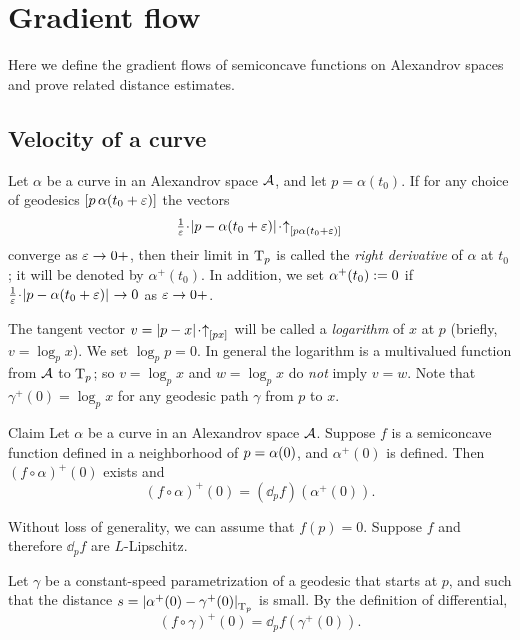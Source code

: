 \chapter{Gradient flow}\label{chap:GF}

Here we define the gradient flows of semiconcave functions on Alexandrov spaces and prove related distance estimates.

\section{Velocity of a curve}\label{Velocity of curve}

Let $\alpha$ be a curve in an Alexandrov space $\mathcal{A}$, and let $p=\alpha(t_0)$.
If for any choice of 
geodesics $[p\,\alpha(t_0+\varepsilon)]$ the vectors 
\[\tfrac{1}{\eps}\cdot\dist{p}{\alpha(t_0+\eps)}{}\cdot\dir p{\alpha(t_0+\eps)}\]
converge as $\varepsilon\to 0+$, then their limit in $\mathrm{T}_p$ is called the \emph{right derivative} of $\alpha$ at $t_0$; it will be denoted by $\alpha^+(t_0)$.
In addition, we set $\alpha^+(t_0)\mathrel{:=}0$
if $\tfrac{1}{\eps}\cdot\dist{p}{\alpha(t_0+\eps)}{}\to 0$ as $\varepsilon\to 0+$.

The tangent vector $v=\dist px{}\cdot\dir px$ will be called a \emph{logarithm} of $x$ at $p$ (briefly, $v=\log_p x$).
We set $\log_p p=0$.
In general the logarithm is a multivalued function from $\mathcal{A}$ to $\mathrm{T}_p$; so $v=\log_p x$ and $w=\log_p x$ do \textit{not} imply $v=w$.
Note that $\gamma^+(0)=\log_px$ for any geodesic path $\gamma$ from $p$ to $x$.\label{page:log}

\begin{thm}{Claim}\label{clm:fa'=dfa'}
Let $\alpha$ be a curve in an Alexandrov space $\mathcal{A}$.
Suppose $f$ is a semiconcave function defined in a neighborhood of $p\z=\alpha(0)$, and $\alpha^+(0)$ is defined.
Then $(f\circ\alpha)^+(0)$ exists and 
\[(f\circ\alpha)^+(0)
=
(\dd_pf)(\alpha^+(0)).\]

\end{thm}

Without loss of generality, we can assume that $f(p)=0$.
Suppose $f$ and therefore $\dd_pf$ are $L$-Lipschitz.

Let $\gamma$ be a constant-speed parametrization of a geodesic that starts at $p$, and
such that the distance
$s=\dist{\alpha^+(0)}{\gamma^+(0)}{\T_p}$
is small.
By the definition of differential,
\[(f\circ\gamma)^+(0)=\dd_pf(\gamma^+(0)).\]

